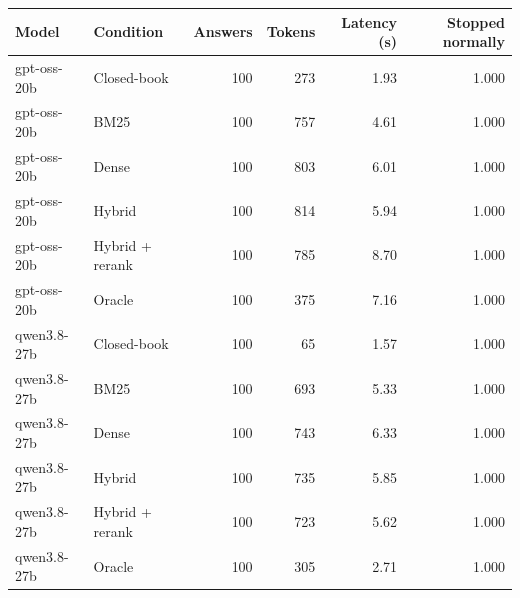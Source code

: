 \begin{tabular}{@{}llrrrr@{}}
\toprule
Model & Condition & Answers & Tokens & Latency (s) & Stopped normally \\
\midrule
gpt-oss-20b & Closed-book & 100 & 273 & 1.93 & 1.000 \\
gpt-oss-20b & BM25 & 100 & 757 & 4.61 & 1.000 \\
gpt-oss-20b & Dense & 100 & 803 & 6.01 & 1.000 \\
gpt-oss-20b & Hybrid & 100 & 814 & 5.94 & 1.000 \\
gpt-oss-20b & Hybrid + rerank & 100 & 785 & 8.70 & 1.000 \\
gpt-oss-20b & Oracle & 100 & 375 & 7.16 & 1.000 \\
\midrule
qwen3.8-27b & Closed-book & 100 & 65 & 1.57 & 1.000 \\
qwen3.8-27b & BM25 & 100 & 693 & 5.33 & 1.000 \\
qwen3.8-27b & Dense & 100 & 743 & 6.33 & 1.000 \\
qwen3.8-27b & Hybrid & 100 & 735 & 5.85 & 1.000 \\
qwen3.8-27b & Hybrid + rerank & 100 & 723 & 5.62 & 1.000 \\
qwen3.8-27b & Oracle & 100 & 305 & 2.71 & 1.000 \\
\bottomrule
\end{tabular}
